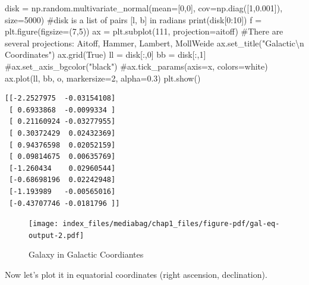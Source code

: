 \documentclass[
  letterpaper,
  DIV=11,
  numbers=noendperiod]{scrreprt}
\newenvironment{Shaded}{\begin{snugshade}}{\end{snugshade}}
\newcommand{\BuiltInTok}[1]{\textcolor[rgb]{0.00,0.23,0.31}{#1}}
\newcommand{\CharTok}[1]{\textcolor[rgb]{0.13,0.47,0.30}{#1}}
\newcommand{\CommentTok}[1]{\textcolor[rgb]{0.37,0.37,0.37}{#1}}
\newcommand{\DecValTok}[1]{\textcolor[rgb]{0.68,0.00,0.00}{#1}}
\newcommand{\FloatTok}[1]{\textcolor[rgb]{0.68,0.00,0.00}{#1}}
\newcommand{\NormalTok}[1]{\textcolor[rgb]{0.00,0.23,0.31}{#1}}
\newcommand{\OperatorTok}[1]{\textcolor[rgb]{0.37,0.37,0.37}{#1}}
\newcommand{\StringTok}[1]{\textcolor[rgb]{0.13,0.47,0.30}{#1}}
\newcommand{\VariableTok}[1]{\textcolor[rgb]{0.07,0.07,0.07}{#1}}
\begin{document}
\begin{tcolorbox}[enhanced jigsaw, toprule=.15mm, colframe=quarto-callout-color-frame, bottomrule=.15mm, leftrule=.75mm, left=2mm, breakable, rightrule=.15mm, arc=.35mm, opacityback=0, colback=white]
\begin{Shaded}
\begin{Highlighting}[]
\NormalTok{disk }\OperatorTok{=}\NormalTok{ np.random.multivariate\_normal(mean}\OperatorTok{=}\NormalTok{[}\DecValTok{0}\NormalTok{,}\DecValTok{0}\NormalTok{], cov}\OperatorTok{=}\NormalTok{np.diag([}\DecValTok{1}\NormalTok{,}\FloatTok{0.001}\NormalTok{]), size}\OperatorTok{=}\DecValTok{5000}\NormalTok{)}
\CommentTok{\#disk is a list of pairs [l, b] in radians}
\BuiltInTok{print}\NormalTok{(disk[}\DecValTok{0}\NormalTok{:}\DecValTok{10}\NormalTok{])}
\NormalTok{f }\OperatorTok{=}\NormalTok{ plt.figure(figsize}\OperatorTok{=}\NormalTok{(}\DecValTok{7}\NormalTok{,}\DecValTok{5}\NormalTok{))}
\NormalTok{ax }\OperatorTok{=}\NormalTok{ plt.subplot(}\DecValTok{111}\NormalTok{, projection}\OperatorTok{=}\StringTok{\textquotesingle{}aitoff\textquotesingle{}}\NormalTok{)}
\CommentTok{\#There are several projections: Aitoff, Hammer, Lambert, MollWeide}
\NormalTok{ax.set\_title(}\StringTok{"Galactic}\CharTok{\textbackslash{}n}\StringTok{ Coordinates"}\NormalTok{)}
\NormalTok{ax.grid(}\VariableTok{True}\NormalTok{)}
\NormalTok{ll }\OperatorTok{=}\NormalTok{ disk[:,}\DecValTok{0}\NormalTok{]}
\NormalTok{bb }\OperatorTok{=}\NormalTok{ disk[:,}\DecValTok{1}\NormalTok{]}
\CommentTok{\#ax.set\_axis\_bgcolor("black")}
\CommentTok{\#ax.tick\_params(axis=\textquotesingle{}x\textquotesingle{}, colors=\textquotesingle{}white\textquotesingle{})}
\NormalTok{ax.plot(ll, bb, }\StringTok{\textquotesingle{}o\textquotesingle{}}\NormalTok{, markersize}\OperatorTok{=}\DecValTok{2}\NormalTok{, alpha}\OperatorTok{=}\FloatTok{0.3}\NormalTok{)}
\NormalTok{plt.show()}
\end{Highlighting}
\end{Shaded}

\begin{verbatim}
[[-2.2527975  -0.03154108]
 [ 0.6933868  -0.0099334 ]
 [ 0.21160924 -0.03277955]
 [ 0.30372429  0.02432369]
 [ 0.94376598  0.02052159]
 [ 0.09814675  0.00635769]
 [-1.260434    0.02960544]
 [-0.68698196  0.02242948]
 [-1.193989   -0.00565016]
 [-0.43707746 -0.0181796 ]]
\end{verbatim}

\begin{figure}[H]

{\centering \texttt{[image: index\_files/mediabag/chap1\_files/figure-pdf/gal-eq-output-2.pdf]}

}

\caption{Galaxy in Galactic Coordiantes}

\end{figure}%

Now let's plot it in equatorial coordinates (right ascension,
declination).


\end{tcolorbox}
\end{document}
